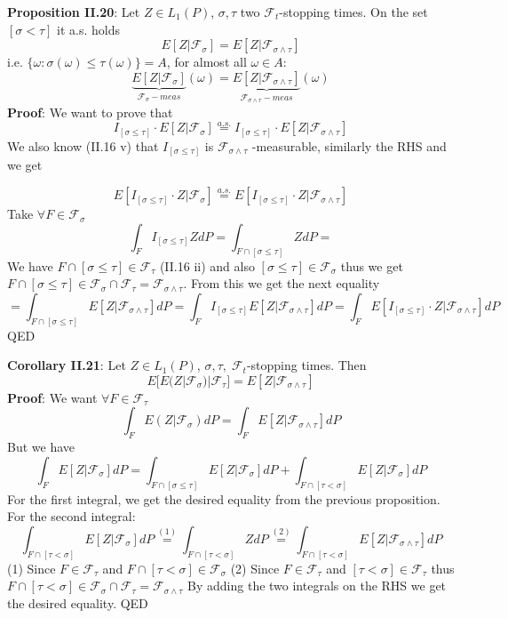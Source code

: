 \documentclass[english]{article}
\newcommand{\ub}{\underbrace}
\newcommand{\note}[1]{\noindent\textbf{#1}}
\newcommand{\F}{\mathcal F}
\newcommand{\as}[1]{\stackrel {a.s.}{#1}}
\begin{document}
\note{Proposition II.20}: Let $Z \in L_1(P)$, $\sigma, \tau$ two $\F_t$-stopping times. On the set $[\sigma< \tau]$ it a.s. holds
$$E[Z|\F_\sigma] = E[Z|\F_{\sigma \wedge \tau}]$$
i.e. $\{\omega: \sigma(\omega) \leq \tau(\omega) \} = A$, for almost all $\omega \in A$:
$$\ub{E[Z|\F_\sigma]}_{\F_\sigma-meas}(\omega) = \ub{E[Z|\F_{\sigma \wedge \tau}]}_{\F_{\sigma\wedge \tau}-meas}(\omega)$$
\note{Proof}: We want to prove that
 $$I_{[\sigma \leq \tau]} \cdot E[Z|\F_\sigma] \as= I_{[\sigma \leq \tau]} \cdot E[Z|\F_{\sigma\wedge \tau}]$$
 We also know (II.16 v) that $I_{[\sigma\leq\tau]}$ is $\F_{\sigma\wedge \tau}$ -measurable, similarly the RHS and we get

 $$E[I_{[\sigma \leq \tau]} \cdot  Z|\F_\sigma] \as= E[ I_{[\sigma \leq \tau]} \cdot Z|\F_{\sigma\wedge \tau}]$$
 Take $\forall F\in \F_\sigma$
 $$ \int_F I_{[\sigma \leq \tau]} Z dP = \int_{F\cap [\sigma \leq \tau]} Z dP=$$
 We have $F\cap [\sigma\leq\tau]\in \F_\tau$ (II.16 ii) and also $[\sigma\leq\tau]\in \F_\sigma$ thus we get $F\cap [\sigma\leq \tau] \in \F_\sigma \cap \F_\tau = \F_{\sigma \wedge \tau}$. From this we get the next equality
 $$=\int_{F\cap [\sigma\leq\tau]} E[Z|\F_{\sigma\wedge \tau}]dP = \int_F I_{[\sigma\leq\tau]} E[Z|\F_{\sigma\wedge\tau}]dP =\int_F E[ I_{[\sigma\leq\tau]} \cdot Z|\F_{\sigma\wedge\tau}]dP $$
 QED \newline
 
 \note{Corollary II.21}: Let $Z \in L_1 (P)$, $\sigma,\tau,\; \F_t$-stopping times. Then
 $$E\big[ E(Z|\F_\sigma) | \F_\tau \big] = E[Z | \F_{\sigma \wedge \tau}]$$
\note{Proof}: We want  $\forall F \in \F_\tau$
$$\int_F E(Z|\F_\sigma) dP = \int_F E[Z| \F_{\sigma \wedge \tau}] dP$$ 
 But we have
 $$\int_F E[Z|\F_\sigma] dP = \int_{F\cap [\sigma \leq \tau]} E[Z|\F_\sigma] dP + \int_{F\cap [ \tau<\sigma]} E[Z|\F_\sigma] dP$$
 For the first integral, we get the desired equality from the previous proposition. \newline
 For the second integral:
 $$\int_{F\cap [\tau < \sigma]} E[Z|\F_\sigma] dP \stackrel{(1)}= \int_{F\cap [\tau < \sigma]} Z dP \stackrel{(2)}= \int_{F\cap [\tau < \sigma]} E[Z|\F_{\sigma \wedge \tau}] dP$$
(1) Since $F \in \F_\tau$ and $F\cap [\tau<\sigma] \in \F_\sigma$\newline
(2) Since $F\in \F_\tau$ and $[\tau < \sigma] \in \F_\tau$ thus $F\cap [\tau < \sigma] \in \F_\sigma \cap \F_\tau = \F_{\sigma\wedge \tau}$ \newline
By adding the two integrals on the RHS we get the desired equality. QED \newline
\end{document}
